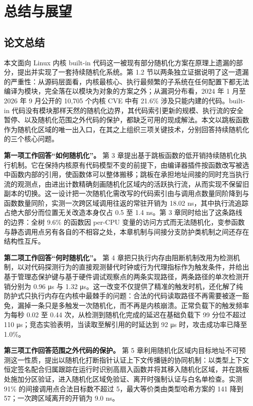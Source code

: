 \chapter{总结与展望}
\label{chap:6}

\section{论文总结}

本文面向 Linux 内核 built-in 代码这一被现有部分随机化方案在原理上遗漏的部分，提出并实现了一套持续随机化系统。第 1.2 节以两条独立证据说明了这一遗漏的严重性：从源码层面看，内核最核心、执行最频繁的子系统在任何配置下都无法编译为模块，完全落在以模块为对象的方案之外；从漏洞分布看，2024 年 1 月至 2026 年 9 月公开的 10,705 个内核 CVE 中有 21.6\% 涉及只能内建的代码。built-in 代码没有模块那样天然的随机化边界，其代码索引更新的规模、执行流的安全暂停、以及随机化范围之外代码的保护，都缺乏可用的现成解法。本文以跳板函数作为随机化区域的唯一出入口，在其之上组织三项关键技术，分别回答持续随机化的三个核心问题。

\textbf{第一项工作回答“如何随机化”。} 第 3 章提出基于跳板函数的低开销持续随机化执行机制。它在保持内核原有代码模型不变的前提下，由编译器插件按函数改写被选中函数内部的引用，使函数体可以整体搬移；跳板在承担地址间接的同时充当执行流的观测点，由进出计数精确刻画随机化区域内的活跃执行流，从而实现不保留旧副本的切换。这一设计把一次随机化需改写的代码索引由与调用点数量同阶降到与函数数量同阶，实测一次跨区域调用往返的常驻开销为 18.02 ns，其中执行流追踪占绝大部分而位置无关改造本身仅占 0.5 至 1.4 ns。第 3 章同时给出了这条路线的边界：全树 9.6\% 的函数因 per-CPU 变量的访问方式而无法随机化，变参函数与静态调用点另有各自的不相容之处，本章机制与间接分支防护类机制之间还存在结构性互斥。

\textbf{第二项工作回答“何时随机化”。} 第 4 章把只执行内存由阻断机制改用为检测机制，以对代码探测行为的直接观测替代时钟或行为代理指标作为触发条件，并给出基于管理态保护键与基于硬件调试观察点的两条实现路径，两条路径的单次检测开销分别为 0.96 μs 与 1.32 μs。这一改变不仅提供了精准的触发时机，还化解了纯防护式只执行内存在内核中最棘手的问题：合法的代码读取路径不再需要被逐一豁免，漏掉一条只是多触发一次随机化，而不再是内核崩溃。正常负载下的触发频率为每秒 0.02 至 0.44 次，从检测到随机化完成的延迟在基础负载下 99 分位不超过 110 μs；竞态实验表明，当读取至解引用的时延达到 92 μs 时，攻击成功率已降至 1.0\%。

\textbf{第三项工作回答范围之外代码的保护。} 第 5 章利用随机化区域内目标地址不可预测这一性质，提出以随机化打断指针认证上下文传播链的协同机制：以类型上下文恒定签名配合归属跟踪在运行时识别高扇入函数并将其移入随机化区域，并在跳板处施加分区验证，进入随机化区域免验证、离开时强制认证与白名单检查。实测 91\% 的间接调用点合法目标数不超过 5，最大等价类由类型哈希方案的 141 降到 57；一次跨区域离开的开销为 9.0 ns。

